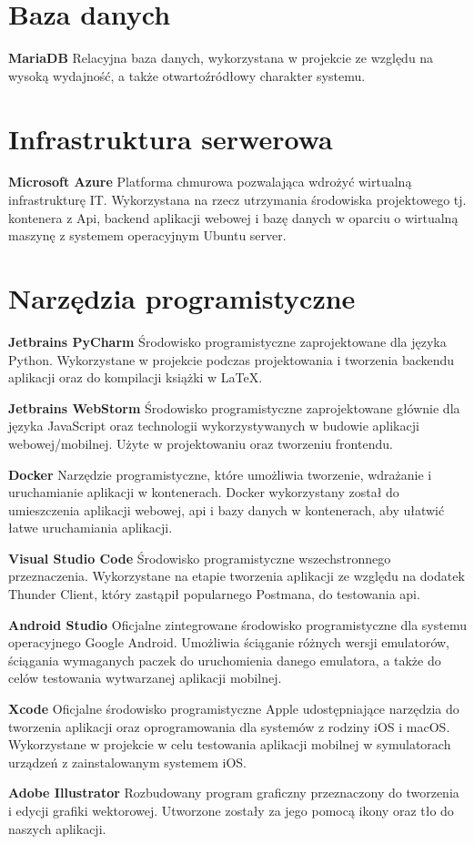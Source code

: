 \section{Baza danych}

\textbf{MariaDB} Relacyjna baza danych, wykorzystana w projekcie ze względu na
wysoką wydajność, a także otwartoźródłowy charakter systemu.

\section{Infrastruktura serwerowa}

\textbf{Microsoft Azure} Platforma chmurowa pozwalająca wdrożyć wirtualną infrastrukturę IT. Wykorzystana na rzecz utrzymania środowiska projektowego tj. kontenera z Api, backend aplikacji webowej i bazę danych w oparciu o wirtualną maszynę z systemem operacyjnym Ubuntu server.

\section{Narzędzia programistyczne}

\textbf{Jetbrains PyCharm} Środowisko programistyczne zaprojektowane dla języka Python. Wykorzystane w projekcie podczas projektowania i tworzenia backendu aplikacji oraz do kompilacji książki w LaTeX.

\medskip

\textbf{Jetbrains WebStorm} Środowisko programistyczne zaprojektowane głównie dla języka JavaScript oraz technologii wykorzystywanych w budowie aplikacji webowej/mobilnej. Użyte w projektowaniu oraz tworzeniu frontendu.

\medskip

\textbf{Docker} Narzędzie programistyczne, które umożliwia tworzenie, wdrażanie i uruchamianie aplikacji w kontenerach. Docker wykorzystany został do umieszczenia aplikacji webowej, api i bazy danych w kontenerach, aby ułatwić łatwe uruchamiania aplikacji.

\medskip

\textbf{Visual Studio Code} Środowisko programistyczne wszechstronnego przeznaczenia. Wykorzystane na etapie tworzenia aplikacji ze względu na dodatek Thunder Client, który zastąpił popularnego Postmana, do testowania api.

\medskip

\textbf{Android Studio} Oficjalne zintegrowane środowisko programistyczne dla systemu operacyjnego Google Android. Umożliwia ściąganie różnych wersji emulatorów, ściągania wymaganych paczek do uruchomienia danego emulatora, a także do celów testowania wytwarzanej aplikacji mobilnej.

\medskip

\textbf{Xcode} Oficjalne środowisko programistyczne Apple udostępniające narzędzia do tworzenia aplikacji oraz oprogramowania dla systemów z rodziny iOS i macOS. Wykorzystane w projekcie w celu testowania aplikacji mobilnej w symulatorach urządzeń z zainstalowanym systemem iOS.

\medskip

\textbf{Adobe Illustrator} Rozbudowany program graficzny przeznaczony do tworzenia i edycji grafiki wektorowej. Utworzone zostały za jego pomocą ikony oraz tło do naszych aplikacji.

